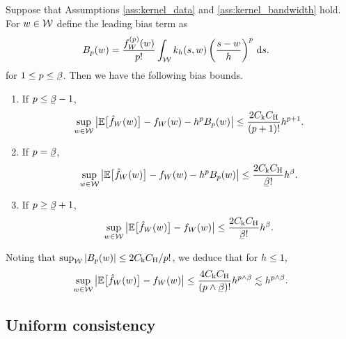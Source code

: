 \begin{lemma}
  \label{lem:bias}

  Suppose that Assumptions \ref{ass:kernel_data} and
  \ref{ass:kernel_bandwidth} hold.
  For $w \in \mathcal{W}$
  define the leading bias term as
  \begin{align*}
    B_p(w)
    &=
    \frac{f_W^{(p)}(w)}{p!}
    \int_{\mathcal{W}}
    k_h(s,w)
    \left(
      \frac{s-w}{h}
    \right)^p
    \,\mathrm{d}s.
  \end{align*}
  for $1 \leq p \leq \flbeta$.
  Then we have the following bias bounds.
  \begin{enumerate}[label=(\roman*)]

    \item If $p \leq \flbeta - 1$,
      \begin{align*}
        \sup_{w \in \mathcal{W}}
        \big|
        \mathbb{E}\big[\hat f_W(w)\big]
        - f_W(w)
        - h^p B_p(w)
        \big|
        \leq
        \frac{2C_\mathrm{k} C_\mathrm{H}}{(p+1)!}
        h^{p+1}.
      \end{align*}

    \item If $p = \flbeta$,
      \begin{align*}
        \sup_{w \in \cW}
        \big|
        \E\big[\hat f_W(w)\big]
        - f_W(w)
        - h^p B_p(w)
        \big|
        \leq
        \frac{2 \Ck \CH}{\flbeta !}
        h^\beta.
      \end{align*}

    \item If $p \geq \flbeta+1$,
      \begin{align*}
        \sup_{w \in \cW}
        \big|
        \E\big[\hat f_W(w)\big]
        - f_W(w)
        \big|
        \leq
        \frac{2 \Ck \CH}{\flbeta !}
        h^\beta.
      \end{align*}

  \end{enumerate}
  Noting that
  $\sup_{\mathcal{W}} |B_p(w)| \leq 2 C_\mathrm{k} C_\mathrm{H} / p!$,
  we deduce that for $h \leq 1$,
  \begin{align*}
    \sup_{w \in \cW}
    \big|
    \E\big[\hat f_W(w)\big]
    - f_W(w)
    \big|
    \leq
    \frac{4 \Ck \CH}{(p \wedge \flbeta)!}
    h^{p \wedge \beta}
    \lesssim
    h^{p \wedge \beta}.
  \end{align*}

\end{lemma}

\subsection{Uniform consistency}

